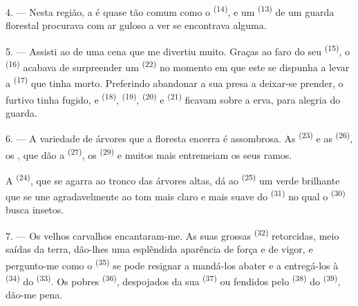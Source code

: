 4. --- Nesta região, a  é quase tão comum como o
 \textsuperscript{(14)}, e um 
\textsuperscript{(13)} de um guarda florestal procurava com ar guloso a ver se
encontrava alguma.

\VUsaut{3.0mm}
\VUsaut{3.0mm}

5. --- Assisti ao  de uma cena que me divertiu muito. Graças
ao faro do seu  \textsuperscript{(15)}, o  \textsuperscript{(16)} acabava de surpreender um  \textsuperscript{(22)} no momento em que este se dispunha a levar a
 \textsuperscript{(17)} que tinha morto. Preferindo abandonar a sua
presa a deixar-se prender, o furtivo tinha fugido, e 
\textsuperscript{(18)},  \textsuperscript{(19)}, 
\textsuperscript{(20)} e  \textsuperscript{(21)} ficavam sobre a erva,
para alegria do guarda.

6. --- A variedade de árvores que a floresta encerra é assombrosa. As
 \textsuperscript{(23)} e as  \textsuperscript{(26)}, os
, que dão a  \textsuperscript{(27)}, os
 \textsuperscript{(29)} e muitos mais entremeiam os seus ramos.

A  \textsuperscript{(24)}, que se agarra ao tronco das árvores altas,
dá ao  \textsuperscript{(25)} um verde brilhante que se une
agradavelmente ao tom mais claro e mais suave do 
\textsuperscript{(31)} no qual o  \textsuperscript{(30)} busca
insetos.

\VUsaut{3.0mm}
\VUsaut{3.0mm}

7. --- Os velhos carvalhos encantaram-me. As suas grossas 
\textsuperscript{(32)} retorcidas, meio saídas da terra, dão-lhes uma esplêndida
aparência de força e de vigor, e pergunto-me como o 
\textsuperscript{(35)} se pode resignar a mandá-los abater e a entregá-los à
 \textsuperscript{(34)} do  \textsuperscript{(33)}. Os
pobres  \textsuperscript{(36)}, despojados da sua 
\textsuperscript{(37)} ou fendidos pelo  \textsuperscript{(38)} do
 \textsuperscript{(39)}, dão-me pena.

